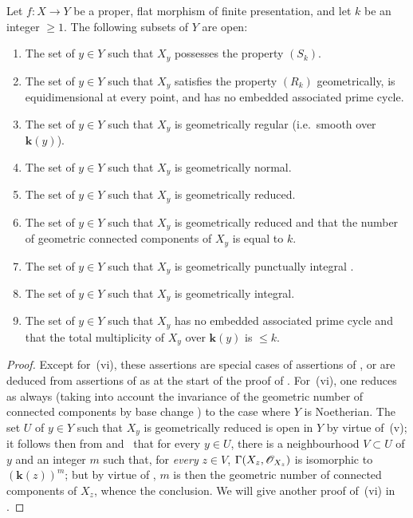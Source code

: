 \begin{theorem}[12.2.4]
\label{IV.12.2.4}
Let $f:X\to Y$ be a proper, flat morphism of finite presentation, and let $k$ be an integer $\geqslant 1$.
The following subsets of $Y$ are open:
\begin{enumerate}[label=\textup{(\roman*)}]
  \item The set of $y\in Y$ such that $X_y$ possesses the property $(S_k)$.
  \item The set of $y\in Y$ such that $X_y$ satisfies the property $(R_k)$ geometrically, is equidimensional at every point, and has no embedded associated prime cycle.
  \item The set of $y\in Y$ such that $X_y$ is geometrically regular \textup{(i.e.}\ smooth over $\boldsymbol{k}(y)$\textup{)}.
  \item The set of $y\in Y$ such that $X_y$ is geometrically normal.
  \item The set of $y\in Y$ such that $X_y$ is geometrically reduced.
  \item The set of $y\in Y$ such that $X_y$ is geometrically reduced and that the number of geometric connected components of $X_y$ is equal to $k$.
  \item The set of $y\in Y$ such that $X_y$ is geometrically punctually integral .
  \item The set of $y\in Y$ such that $X_y$ is geometrically integral.
  \item The set of $y\in Y$ such that $X_y$ has no embedded associated prime cycle and that the total multiplicity  of $X_y$ over $\boldsymbol{k}(y)$ is $\leqslant k$.
\end{enumerate}
\end{theorem}

\begin{proof}
Except for~(vi), these assertions are special cases of assertions of , or are deduced from assertions of  as at the start of the proof of .
For~(vi), one reduces as always (taking into account the invariance of the geometric number of connected components by base change ) to the case where $Y$ is Noetherian.
The set $U$ of $y\in Y$ such that $X_y$ is geometrically reduced is open in $Y$ by virtue of~(v); it follows then from  and~ that for every $y\in U$, there is a neighbourhood $V\subset U$ of $y$ and an integer $m$ such that, for \emph{every} $z\in V$, $\Gamma(X_z,\mathscr{O}_{X_z})$ is isomorphic to $(\boldsymbol{k}(z))^m$; but by virtue of , $m$ is then the geometric number of connected components of $X_z$, whence the conclusion.
We will give another proof of~(vi) in .
\end{proof}



